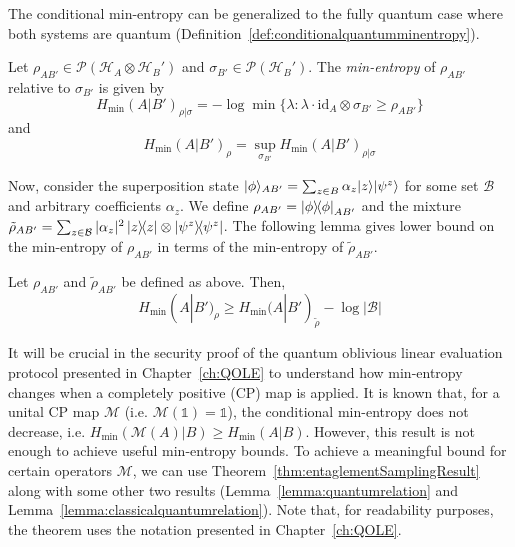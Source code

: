 The conditional min-entropy can be generalized to the fully quantum case where both systems are quantum (Definition~\ref{def:conditionalquantumminentropy}).

\begin{definition}
\label{def:conditionalquantumminentropy}
Let $\rho_{A B'} \in \mathcal{P}(\mathcal{H}_A \otimes \mathcal{H}_B')$ and $\sigma_{B'} \in \mathcal{P}(\mathcal{H}_B')$. The \textit{min-entropy} of $\rho_{A B'}$ relative to $\sigma_{B'}$ is given by
$$H_{\text{min}}(A | B')_{\rho|\sigma} = -\log \min\{ \lambda : \lambda \cdot \text{id}_A \otimes \sigma_{B'} \geq \rho_{A B'} \}$$
and 
$$ H_{\text{min}}(A | B')_{\rho} = \sup_{\sigma_{B'}} H_{\text{min}}(A | B')_{\rho|\sigma} $$
\end{definition}

Now, consider the superposition state $| \phi \rangle_{AB'} = \sum_{z\in B}\alpha_z| z \rangle | \psi^z \rangle$ for some set $\mathcal{B}$ and arbitrary coefficients $\alpha_z$. We define $\rho_{AB'} = \ketbra{\phi}_{AB'}$ and the mixture $\tilde{\rho}_{AB'} = \sum_{z\in \mathcal{B}} |\alpha_z|^2 \ketbra{z} \otimes \ketbra{\psi^z}$. The following lemma gives lower bound on the min-entropy of $\rho_{AB'}$ in terms of the min-entropy of $\tilde{\rho}_{AB'} $.

\begin{lemma}
Let $\rho_{AB'}$ and $\tilde{\rho}_{AB'}$ be defined as above. Then,
$$H_{\text{min}}(A | B')_{\rho} \geq H_{\text{min}}(A | B')_{\tilde{\rho}} - \log |\mathcal{B}|$$
\label{lemma:renner_lower_bound}
\end{lemma}

It will be crucial in the security proof of the quantum oblivious linear evaluation protocol presented in Chapter~\ref{ch:QOLE} to understand how min-entropy changes when a completely positive (CP) map is applied. It is known that, for a unital CP map $\mathcal{M}$ (i.e. $\mathcal{M}(\mathds{1}) = \mathds{1}$), the conditional min-entropy does not decrease, i.e. $H_{\min}(\mathcal{M}(A)| B) \geq H_{\min}(A| B)$. However, this result is not enough to achieve useful min-entropy bounds. To achieve a meaningful bound for certain operators $\mathcal{M}$, we can use Theorem~\ref{thm:entaglementSamplingResult} along with some other two results (Lemma~\ref{lemma:quantumrelation} and Lemma~\ref{lemma:classicalquantumrelation}). Note that, for readability purposes, the theorem uses the notation presented in Chapter~\ref{ch:QOLE}.

